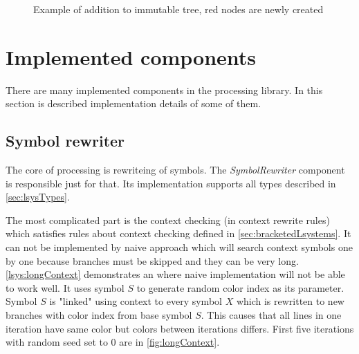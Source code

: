 \begin{figure}[h!]
	\centering
	 \hfill
	\caption{Example of addition to immutable tree, red nodes are newly created}
	\label{fig:immAdd}
\end{figure}


\section{Implemented components}

There are many implemented components in the \lsystem processing library.
In this section is described implementation details of some of them.


\subsection{Symbol rewriter}

The core of \lsystem processing is rewriteing of \lsystem symbols.
The \emph{SymbolRewriter} component is responsible just for that.
Its implementation supports all \lsystem types described in \autoref{sec:lsysTypes}.

The most complicated part is the context checking (in context rewrite rules) which satisfies rules about context checking defined in \autoref{sec:bracketedLsystems}.
It can not be implemented by naive approach which will search context symbols one by one because branches must be skipped and they can be very long.
\autoref{lsys:longContext} demonstrates an \lsystem where naive implementation will not be able to work well.
It uses symbol $S$ to generate random color index as its parameter.
Symbol $S$ is "linked" using context to every symbol $X$ which is rewritten to new branches with color index from base symbol $S$.
This causes that all lines in one iteration have same color but colors between iterations differs.
First five iterations with random seed set to 0 are in \autoref{fig:longContext}.

